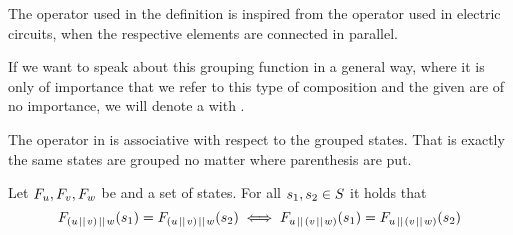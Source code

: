 \documentclass[preview]{standalone}
\begin{document}
The operator \pll used in the definition is inspired from the operator used in electric circuits, when the respective elements are connected in parallel.

If we want to speak about this grouping function in a general way, where it is only of importance that we refer to this type of composition and the given \grpfctsN are of no importance, we will denote a \emph{\parllcompN \grpfctN} with \gfctpll.

The operator \pll in \gfctpll is associative with respect to the grouped states. That is exactly the same states are grouped no matter where parenthesis are put.
\begin{proposition}
	Let $\grpfct[u], \grpfct[v], \grpfct[w]$ be \grpfctsN and \states a set of states. For all $\state_1, \state_2 \in \states$ it holds that
	\[
	\grpfct[(u \pll v) \pll w](\state_1) = \grpfct[(u \pll v) \pll w](\state_2) \iff \grpfct[u \pll (v \pll w)](\state_1) = \grpfct[u \pll (v \pll w)](\state_2)
	\]
\end{proposition}
\end{document}

